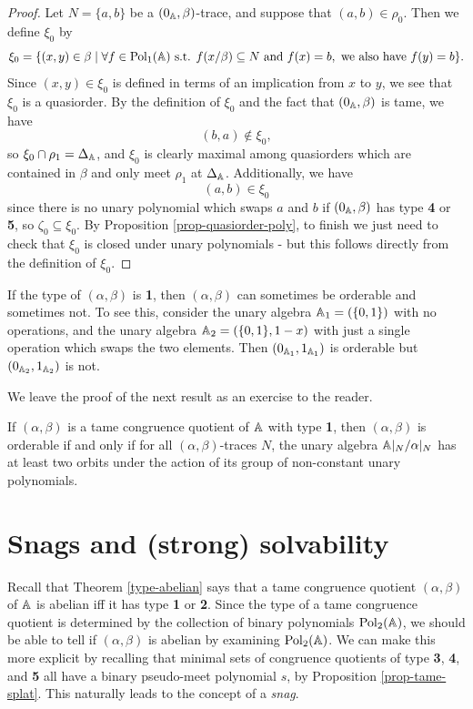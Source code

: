 \begin{appendices}
\begin{proof}
Let $N = \{a,b\}$ be a $(0_{\mathbb{A}},\beta)$-trace, and suppose that $(a,b) \in \rho_0$. Then we define $\xi_0$ by
\[
\xi_0 = \{(x,y) \in \beta \mid \forall f \in \operatorname{Pol}_1(\mathbb{A}) \text{ s.t. } f(x/\beta) \subseteq N \text{ and } f(x) = b, \text{ we also have } f(y) = b\}.
\]
Since $(x,y) \in \xi_0$ is defined in terms of an implication from $x$ to $y$, we see that $\xi_0$ is a quasiorder. By the definition of $\xi_0$ and the fact that $(0_{\mathbb{A}},\beta)$ is tame, we have
\[
(b,a) \not\in \xi_0,
\]
so $\xi_0 \cap \rho_1 = \Delta_{\mathbb{A}}$, and $\xi_0$ is clearly maximal among quasiorders which are contained in $\beta$ and only meet $\rho_1$ at $\Delta_{\mathbb{A}}$. Additionally, we have
\[
(a,b) \in \xi_0
\]
since there is no unary polynomial which swaps $a$ and $b$ if $(0_{\mathbb{A}},\beta)$ has type \textbf{4} or \textbf{5}, so $\zeta_0 \subseteq \xi_0$. By Proposition \ref{prop-quasiorder-poly}, to finish we just need to check that $\xi_0$ is closed under unary polynomials - but this follows directly from the definition of $\xi_0$.
\end{proof}

\begin{ex} If the type of $(\alpha,\beta)$ is \textbf{1}, then $(\alpha,\beta)$ can sometimes be orderable and sometimes not. To see this, consider the unary algebra $\mathbb{A}_1 = (\{0,1\})$ with no operations, and the unary algebra $\mathbb{A}_2 = (\{0,1\}, 1-x)$ with just a single operation which swaps the two elements. Then $(0_{\mathbb{A}_1},1_{\mathbb{A}_1})$ is orderable but $(0_{\mathbb{A}_2}, 1_{\mathbb{A}_2})$ is not.
\end{ex}

We leave the proof of the next result as an exercise to the reader.

\begin{thm} If $(\alpha,\beta)$ is a tame congruence quotient of $\mathbb{A}$ with type \textbf{1}, then $(\alpha,\beta)$ is orderable if and only if for all $(\alpha,\beta)$-traces $N$, the unary algebra $\mathbb{A}|_N/\alpha|_N$ has at least two orbits under the action of its group of non-constant unary polynomials.
\end{thm}


\section{Snags and (strong) solvability}\label{a-sec-snags}

Recall that Theorem \ref{type-abelian} says that a tame congruence quotient $(\alpha,\beta)$ of $\mathbb{A}$ is abelian iff it has type \textbf{1} or \textbf{2}. Since the type of a tame congruence quotient is determined by the collection of binary polynomials $\operatorname{Pol}_2(\mathbb{A})$, we should be able to tell if $(\alpha,\beta)$ is abelian by examining $\operatorname{Pol}_2(\mathbb{A})$. We can make this more explicit by recalling that minimal sets of congruence quotients of type \textbf{3}, \textbf{4}, and \textbf{5} all have a binary pseudo-meet polynomial $s$, by Proposition \ref{prop-tame-splat}. This naturally leads to the concept of a \emph{snag}.


\end{appendices}
